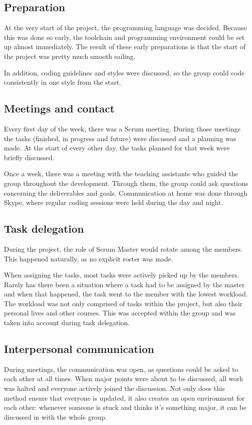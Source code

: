 \documentclass[10pt,a4paper]{report}
\begin{document}
		\subsection{Preparation}
			At the very start of the project, the programming language was decided. Because this was done so early, the toolchain and programming environment could be set up almost immediately. The result of these early preparations is that the start of the project was pretty much smooth sailing.
			
			In addition, coding guidelines and styles were discussed, so the group could code consistently in one style from the start.
		
		\subsection{Meetings and contact}
			Every first day of the week, there was a Scrum meeting. During those meetings the tasks (finished, in progress and future) were discussed and a planning was made. At the start of every other day, the tasks planned for that week were briefly discussed.
			
			Once a week, there was a meeting with the teaching assistants who guided the group throughout the development. Through them, the group could ask questions concerning the deliverables and goals.
			Communication at home was done through Skype, where regular coding sessions were held during the day and night.

		\subsection{Task delegation}
			During the project, the role of Scrum Master would rotate among the members. This happened naturally, as no explicit roster was made.
			
			When assigning the tasks, most tasks were actively picked up by the members. Rarely has there been a situation where a task had to be assigned by the master and when that happened, the task went to the member with the lowest workload. The workload was not only comprised of tasks within the project, but also their personal lives and other courses. This was accepted within the group and was taken into account during task delegation.

		\subsection{Interpersonal communication}
			During meetings, the communication was open, as questions could be asked to each other at all times. When major points were about to be discussed, all work was halted and everyone actively joined the discussion. Not only does this method ensure that everyone is updated, it also creates an open environment for each other: whenever someone is stuck and thinks it's something major, it can be discussed in with the whole group.
			
\end{document}
